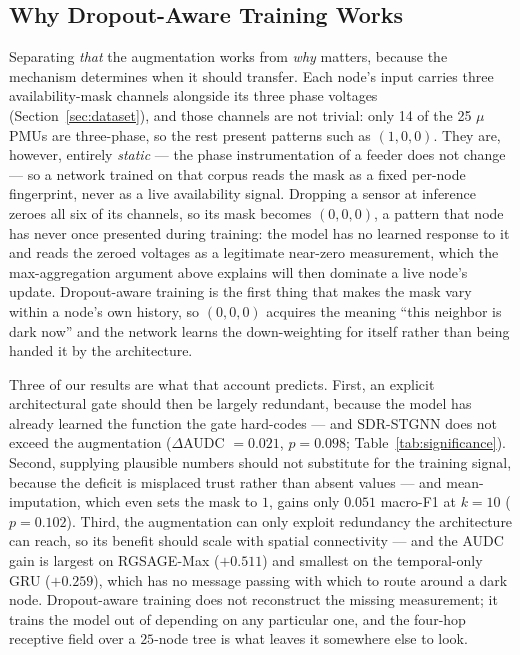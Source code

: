 \documentclass[3p,times,procedia]{elsarticle}
\begin{document}
\subsection{Why Dropout-Aware Training Works}
\label{sec:disc-mechanism}

Separating \emph{that} the augmentation works from \emph{why} matters, because the mechanism determines when it should transfer. Each node's input carries three availability-mask channels alongside its three phase voltages (Section~\ref{sec:dataset}), and those channels are not trivial: only 14 of the 25 $\mu$PMUs are three-phase, so the rest present patterns such as $(1,0,0)$. They are, however, entirely \emph{static} --- the phase instrumentation of a feeder does not change --- so a network trained on that corpus reads the mask as a fixed per-node fingerprint, never as a live availability signal. Dropping a sensor at inference zeroes all six of its channels, so its mask becomes $(0,0,0)$, a pattern that node has never once presented during training: the model has no learned response to it and reads the zeroed voltages as a legitimate near-zero measurement, which the max-aggregation argument above explains will then dominate a live node's update. Dropout-aware training is the first thing that makes the mask vary within a node's own history, so $(0,0,0)$ acquires the meaning ``this neighbor is dark now'' and the network learns the down-weighting for itself rather than being handed it by the architecture.

Three of our results are what that account predicts. First, an explicit architectural gate should then be largely redundant, because the model has already learned the function the gate hard-codes --- and SDR-STGNN does not exceed the augmentation ($\Delta$AUDC $=0.021$, $p=0.098$; Table~\ref{tab:significance}). Second, supplying plausible numbers should not substitute for the training signal, because the deficit is misplaced trust rather than absent values --- and mean-imputation, which even sets the mask to $1$, gains only $0.051$ macro-F1 at $k=10$ ($p=0.102$). Third, the augmentation can only exploit redundancy the architecture can reach, so its benefit should scale with spatial connectivity --- and the AUDC gain is largest on RGSAGE-Max ($+0.511$) and smallest on the temporal-only GRU ($+0.259$), which has no message passing with which to route around a dark node. Dropout-aware training does not reconstruct the missing measurement; it trains the model out of depending on any particular one, and the four-hop receptive field over a $25$-node tree is what leaves it somewhere else to look.
\end{document}
